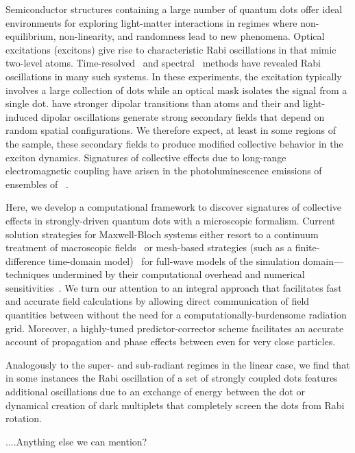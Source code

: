 Semiconductor structures containing a large number of quantum dots offer ideal environments for exploring light-matter interactions in regimes where non-equilibrium, non-linearity, and randomness lead to new phenomena.
Optical excitations (excitons) give rise to characteristic Rabi oscillations in \qds{} that mimic two-level atoms.
Time-resolved~\cite{stievater,shih} and spectral~\cite{kamada} methods have revealed Rabi oscillations in many such systems.
In these experiments, the excitation typically involves a large collection of dots while an optical mask isolates the signal from a single dot.
\Qds{} have stronger dipolar transitions than atoms and their and light-induced dipolar oscillations generate strong secondary fields that depend on random spatial configurations.
We therefore expect, at least in some regions of the sample, these secondary fields to produce modified collective behavior in the exciton dynamics.
Signatures of collective effects due to long-range electromagnetic coupling have arisen in the photoluminescence emissions of ensembles of \qds{}~\cite{forchel}.

Here, we develop a computational framework to discover signatures of collective effects in strongly-driven quantum dots with a microscopic formalism.
Current solution strategies for Maxwell-Bloch systems either resort to a continuum treatment of macroscopic fields~\cite{} or mesh-based strategies (such as a finite-difference time-domain model)~\cite{Vanneste2001, Fratalocchi2008} for full-wave models of the simulation domain---techniques undermined by their computational overhead and numerical sensitivities~\cite{Baczewski2013}.
We turn our attention to an integral approach that facilitates fast and accurate field calculations by allowing direct communication of field quantities between \qds{} without the need for a computationally-burdensome radiation grid.
Moreover, a highly-tuned predictor-corrector scheme facilitates an accurate account of propagation and phase effects between \qds{} even for very close particles. 

Analogously to the super- and sub-radiant regimes in the linear case, we find that in some instances the Rabi oscillation of a set of strongly coupled dots features additional oscillations due to an exchange of energy between the dot or dynamical creation of dark multiplets that completely screen the dots from Rabi rotation.


....Anything else we can mention?
